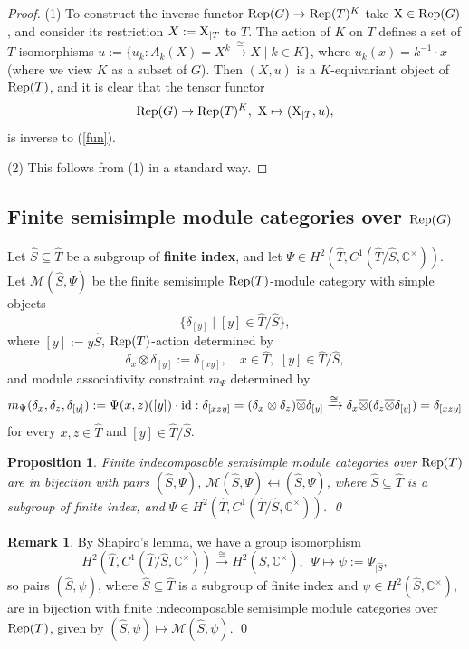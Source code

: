 \documentclass{amsart}
\newtheorem{proposition}[theorem]{Proposition}
\theoremstyle{definition}
\newtheorem{remark}[theorem]{Remark}
\newcommand{\id}{{\rm id}}
\newcommand{\Rep}{{\rm Rep}}
\newcommand{\M}{\mathscr{M}}
\newcommand{\ot}{\otimes}
\numberwithin{equation}{section}
\begin{document}
\begin{proof}
(1) To construct the inverse functor $\Rep(G)\to \Rep(T)^K$ take ${\rm X}\in \Rep(G)$, and consider its restriction $X:={\rm X}_{|T}$ to $T$.  
The action of $K$ on $T$ defines a set of $T$-isomorphisms $u:=\{u_k:A_k(X)=X^{k}\xrightarrow{\cong} X\mid k\in K\}$, where $u_k(x)=k^{-1}\cdot x$ (where we view $K$ as a subset of $G$). Then 
$(X,u)$ is a $K$-equivariant object of $\Rep(T)$, and it is clear that the tensor functor
$$\Rep(G)\to \Rep(T)^K,\,\,{\rm X}\mapsto ({\rm X}_{|T},u),$$
is inverse to (\ref{fun}).

(2) This follows from (1) in a standard way.
\end{proof}

\subsection{Finite semisimple module categories over $\Rep(G)$}\label{sec:Finite semisimple module categories}
Let $\widehat{S}\subseteq \widehat{T}$ be a subgroup of {\bf finite index}, and let $\Psi\in H^2(\widehat{T},C^1(\widehat{T}/\widehat{S},\mathbb{C}^{\times}))$. Let $\M(\widehat{S},\Psi)$ be the finite semisimple $\Rep(T)$-module category with simple objects 
$$\{\delta_{[y]}\mid [y]\in \widehat{T}/\widehat{S}\},$$ 
where $[y]:=y\widehat{S}$, $\Rep(T)$-action determined by
$$\delta_{x}\overline{\ot}\delta_{[y]}:=\delta_{[xy]},\quad x\in \widehat{T},\,\,[y]\in \widehat{T}/\widehat{S},$$
and module associativity constraint $m_{\Psi}$ determined by
$$m_{\Psi}(\delta_x,\delta_z,\delta_{[y]}):=\Psi(x,z)([y])\cdot \id:\delta_{[xzy]}=(\delta_{x}\ot \delta_{z})\overline{\ot}\delta_{[y]}\xrightarrow{\cong}\delta_{x}\overline{\ot}(\delta_{z}\overline{\ot}\delta_{[y]})=\delta_{[xzy]}$$
for every $x,z\in \widehat{T}$ and $[y]\in \widehat{T}/\widehat{S}$.

\begin{proposition}\cite{EGNO,G2}\label{fibtor}
Finite indecomposable semisimple module categories over $\Rep(T)$ are in bijection with 
pairs $(\widehat{S},\Psi)$, $\M(\widehat{S},\Psi)\mapsfrom (\widehat{S},\Psi)$, where $\widehat{S}\subseteq \widehat{T}$ is a subgroup of finite index, and $\Psi\in H^2(\widehat{T},C^1(\widehat{T}/\widehat{S},\mathbb{C}^{\times}))$. \qed
\end{proposition}

\begin{remark}\label{shapiro}
By Shapiro's lemma, we have a group isomorphism
$$H^2(\widehat{T},C^1(\widehat{T}/\widehat{S},\mathbb{C}^{\times}))\xrightarrow{\cong}H^2(\widehat{S},\mathbb{C}^{\times}),\,\,\,\Psi\mapsto \psi:=\Psi_{\mid \widehat{S}},$$
so pairs $(\widehat{S},\psi)$, where $\widehat{S}\subseteq \widehat{T}$ is a subgroup of finite index and $\psi\in H^2(\widehat{S},\mathbb{C}^{\times})$, are in bijection with finite indecomposable semisimple module categories over $\Rep(T)$, given by $(\widehat{S},\psi)\mapsto \M(\widehat{S},\psi)$. \qed
\end{remark}
\end{document}
